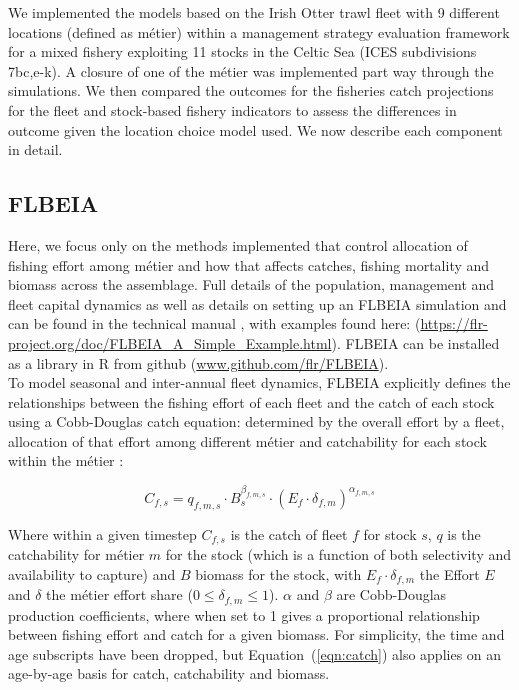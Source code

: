 \documentclass[12pt, halfline, a4paper]{ouparticle}
\begin{document}
We implemented the models based on the Irish Otter trawl fleet with 9
different locations (defined as métier) within a management strategy evaluation
framework for a mixed fishery exploiting 11 stocks in the Celtic Sea (ICES
subdivisions 7bc,e-k). A closure of one of the métier was implemented part way
through the simulations. We then compared the outcomes for the fisheries catch
projections for the fleet and stock-based fishery indicators to assess the
differences in outcome given the location choice model used. We now describe each component in detail.

\subsection{FLBEIA}

Here, we focus only on the methods implemented that control allocation of
fishing effort among métier and how that affects catches, fishing mortality and biomass across the assemblage. Full
details of the population, management and fleet capital dynamics as well as
details on setting up an FLBEIA simulation and can be found in the technical
manual \citep{Garcia2017a}, with examples found here:
(\url{https://flr-project.org/doc/FLBEIA_A_Simple_Example.html}). FLBEIA
can be installed as a library in R from github
(\url{www.github.com/flr/FLBEIA}).\\ 

To model seasonal and inter-annual fleet dynamics, FLBEIA explicitly defines the
relationships between the fishing effort of each fleet and the catch of each
stock using a Cobb-Douglas catch equation: determined by the overall effort by a fleet, allocation of
that effort among different métier and catchability for each stock within
the métier \citep{Garcia2017a}:

\begin{equation}
 C_{f,s} = q_{f,m,s}\cdot B_{s}^{\beta_{f,m,s}} \cdot \left(E_{f}\cdot
	 \delta_{f,m} \right)^{\alpha_{f,m,s}}	
	 \label{eqn:catch}
\end{equation}

Where within a given timestep $C_{f,s}$ is the catch of fleet $f$ for stock
$s$, $q$ is the catchability for métier $m$ for the stock (which is a function
of both selectivity and availability to capture) and $B$ biomass for the stock,
with $E_{f}\cdot \delta_{f,m}$ the Effort $E$ and $\delta$ the métier effort
share ($0 \le \delta_{f,m} \le 1$). $\alpha$ and $\beta$ are Cobb-Douglas production coefficients,
where when set to 1 gives a proportional relationship between fishing effort and
catch for a given biomass. For simplicity, the time and age subscripts have
been dropped, but Equation~(\ref{eqn:catch}) also applies on an age-by-age basis for catch,
catchability and biomass. \\
\end{document}
